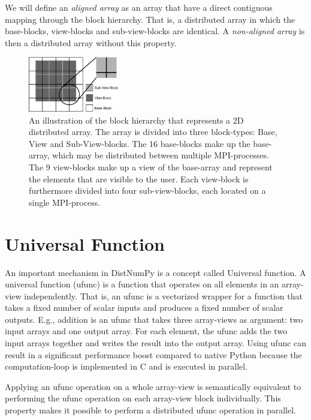 \documentclass[preprint]{../PGAS10/sigplanconf}
\begin{document}

We will define an \emph{aligned array} as an array that have a direct contiguous mapping through the block hierarchy. That is, a distributed array in which the base-blocks, view-blocks and sub-view-blocks are identical. A \emph{non-aligned array} is then a distributed array without this property.

\begin{figure}
 \centering
 \includegraphics[width=150px]{gfx/view_blocks}
 \caption{An illustration of the block hierarchy that represents a 2D distributed array. The array is divided into three block-types: Base, View and Sub-View-blocks. The 16 base-blocks make up the base-array, which may be distributed between multiple MPI-processes. The 9 view-blocks make up a view of the base-array and represent the elements that are visible to the user. Each view-block is furthermore divided into four sub-view-blocks, each located on a single MPI-process.}
 \label{fig:view_block}
\end{figure}


\section{Universal Function}
An important mechanism in DistNumPy is a concept called Universal function. A universal function (ufunc) is a function that operates on all elements in an array-view independently. That is, an ufunc is a vectorized wrapper for a function that takes a fixed number of scalar inputs and produces a fixed number of scalar outputs. E.g., addition is an ufunc that takes three array-views as argument: two input arrays and one output array. For each element, the ufunc adds the two input arrays together and writes the result into the output array. Using ufunc can result in a significant performance boost compared to native Python because the computation-loop is implemented in C and is executed in parallel.

Applying an ufunc operation on a whole array-view is semantically equivalent to performing the ufunc operation on each array-view block individually. This property makes it possible to perform a distributed ufunc operation in parallel. 
\end{document}
